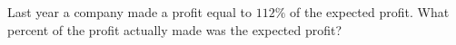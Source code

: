 Last year a company made a profit equal to $112\%$ of the expected profit. What percent of the profit actually made was the expected profit?
